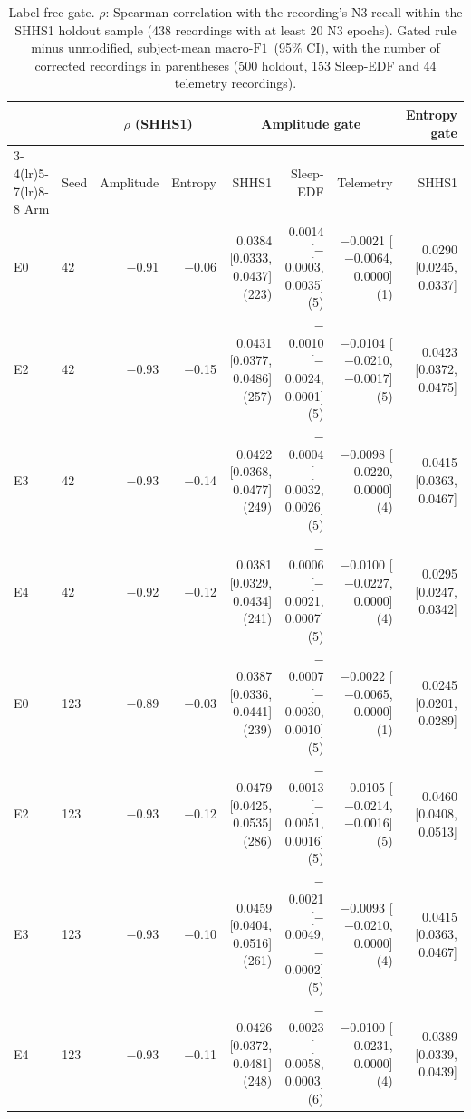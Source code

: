\documentclass[10pt,a4paper]{article}
\newcommand{\mf}{\ensuremath{\mathrm{macro\text{-}F1}}}
\newcommand{\ci}{95\% CI}
\begin{document}
\begin{table}[H]
\centering\scriptsize
\caption{Label-free gate. $\rho$: Spearman correlation with the recording's N3 recall within the SHHS1 holdout
sample (438 recordings with at least 20 N3 epochs). Gated rule minus unmodified, subject-mean \mf\ (\ci), with the
number of corrected recordings in parentheses (500 holdout, 153 Sleep-EDF and 44 telemetry recordings).}
\label{tab:sup_gate}
\setlength{\tabcolsep}{3pt}
\begin{tabular}{llrrrrrr}
\toprule
& & \multicolumn{2}{c}{$\rho$ (SHHS1)} & \multicolumn{3}{c}{Amplitude gate} & Entropy gate \\
\cmidrule(lr){3-4}\cmidrule(lr){5-7}\cmidrule(lr){8-8}
Arm & Seed & Amplitude & Entropy & SHHS1 & Sleep-EDF & Telemetry & SHHS1 \\
\midrule
E0 & 42 & $-$0.91 & $-$0.06 & 0.0384 [0.0333, 0.0437] (223) & 0.0014 [$-$0.0003, 0.0035] (5) & $-$0.0021 [$-$0.0064, 0.0000] (1) & 0.0290 [0.0245, 0.0337] \\
E2 & 42 & $-$0.93 & $-$0.15 & 0.0431 [0.0377, 0.0486] (257) & $-$0.0010 [$-$0.0024, 0.0001] (5) & $-$0.0104 [$-$0.0210, $-$0.0017] (5) & 0.0423 [0.0372, 0.0475] \\
E3 & 42 & $-$0.93 & $-$0.14 & 0.0422 [0.0368, 0.0477] (249) & $-$0.0004 [$-$0.0032, 0.0026] (5) & $-$0.0098 [$-$0.0220, 0.0000] (4) & 0.0415 [0.0363, 0.0467] \\
E4 & 42 & $-$0.92 & $-$0.12 & 0.0381 [0.0329, 0.0434] (241) & $-$0.0006 [$-$0.0021, 0.0007] (5) & $-$0.0100 [$-$0.0227, 0.0000] (4) & 0.0295 [0.0247, 0.0342] \\
E0 & 123 & $-$0.89 & $-$0.03 & 0.0387 [0.0336, 0.0441] (239) & $-$0.0007 [$-$0.0030, 0.0010] (5) & $-$0.0022 [$-$0.0065, 0.0000] (1) & 0.0245 [0.0201, 0.0289] \\
E2 & 123 & $-$0.93 & $-$0.12 & 0.0479 [0.0425, 0.0535] (286) & $-$0.0013 [$-$0.0051, 0.0016] (5) & $-$0.0105 [$-$0.0214, $-$0.0016] (5) & 0.0460 [0.0408, 0.0513] \\
E3 & 123 & $-$0.93 & $-$0.10 & 0.0459 [0.0404, 0.0516] (261) & $-$0.0021 [$-$0.0049, $-$0.0002] (5) & $-$0.0093 [$-$0.0210, 0.0000] (4) & 0.0415 [0.0363, 0.0467] \\
E4 & 123 & $-$0.93 & $-$0.11 & 0.0426 [0.0372, 0.0481] (248) & $-$0.0023 [$-$0.0058, 0.0003] (6) & $-$0.0100 [$-$0.0231, 0.0000] (4) & 0.0389 [0.0339, 0.0439] \\
\bottomrule
\end{tabular}
\end{table}
\end{document}
